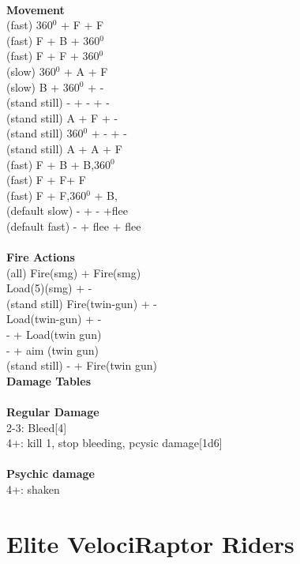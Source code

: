 \ \\ {\bf Movement } \\
(fast) 360$^0$ + F + F \\
(fast) F + B + 360$^0$ \\
(fast) F + F + 360$^0$ \\
(slow) 360$^0$ + A + F \\
(slow) B + 360$^0$ + - \\
(stand still) - + -  + - \\
(stand still) A + F + - \\
(stand still) 360$^0$ + - + - \\
(stand still) A + A + F \\
(fast) F + B + B,360$^0$ \\
(fast) F + F+ F \\
(fast) F + F,360$^0$ + B, \\
(default slow) - + - +flee \\
(default fast) - + flee + flee \\
\ \\ {\bf Fire Actions } \\
(all) Fire(smg) + Fire(smg) \\
Load(5)(smg) + -  \\
(stand still) Fire(twin-gun) + -  \\
Load(twin-gun) + - \\
- + Load(twin gun) \\
- + aim (twin gun) \\
(stand still) - + Fire(twin gun) \\



{\bf Damage Tables} \\
\ \\ {\bf Regular Damage } \\
2-3: Bleed[4] \\
4+: kill 1, stop bleeding, pcysic damage[1d6] \\
\ \\ {\bf Psychic damage } \\
4+: shaken \\









\pagebreak

\section{ Elite VelociRaptor Riders }

